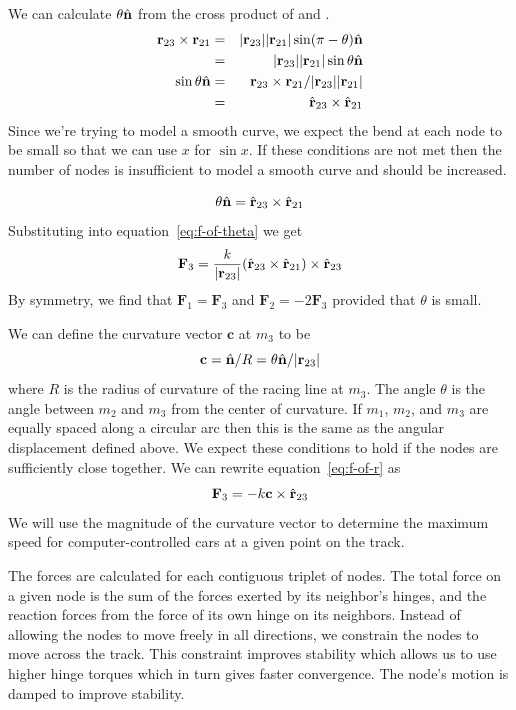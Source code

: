 \documentclass{article}
\begin{document}
We can calculate $\theta \hat{\mathbf{n}}$ from the cross product of  and .
\begin{eqnarray}
  \mathbf{r}_{\mathrm{23}} \times \mathbf{r}_{\mathrm{21}} & = & |\mathbf{r}_{\mathrm{23}}||\mathbf{r}_{\mathrm{21}}| \sin (\pi - \theta) \hat{\mathbf{n}} \\
  & = & |\mathbf{r}_{\mathrm{23}}||\mathbf{r}_{\mathrm{21}}| \sin \theta \hat{\mathbf{n}} \\
  \sin \theta \hat{\mathbf{n}} & = & \mathbf{r}_{\mathrm{23}} \times \mathbf{r}_{\mathrm{21}} / |\mathbf{r}_{\mathrm{23}}||\mathbf{r}_{\mathrm{21}}| \\
  & = & \hat{\mathbf{r}}_{23} \times \hat{\mathbf{r}}_{21}
\end{eqnarray}
Since we're trying to model a smooth curve, we expect the bend at each node to
be small so that we can use $x$ for $\sin x$.  If these conditions are not met
then the number of nodes is insufficient to model a smooth curve and should be
increased.

\begin{equation}
  \theta \hat{\mathbf{n}} = \hat{\mathbf{r}}_{23} \times \hat{\mathbf{r}}_{21}
  \label{eq:theta-n-hat}
\end{equation}
Substituting into equation~\ref{eq:f-of-theta} we get
\begin{equation}
  \mathbf{F}_3 = \frac{k}{|\mathbf{r}_{\mathrm{23}}|} (\hat{\mathbf{r}}_{23} \times \hat{\mathbf{r}}_{21}) \times \hat{\mathbf{r}}_{23}
  \label{eq:f-of-r}
\end{equation}
By symmetry, we find that $\mathbf{F}_1 = \mathbf{F}_3$ and $\mathbf{F}_2 =
-2\mathbf{F}_3$ provided that $\theta$ is small.

We can define the curvature vector $\mathbf{c}$ at $m_3$ to be
\begin{equation}
  \mathbf{c} = \hat{\mathbf{n}}/R = \theta \hat{\mathbf{n}} / |\mathbf{r}_{\mathrm{23}}|
\end{equation}
where $R$ is the radius of curvature of the racing line at $m_3$.  The angle
$\theta$ is the angle between $m_2$ and $m_3$ from the center of curvature.  If
$m_1$, $m_2$, and $m_3$ are equally spaced along a circular arc then this is the
same as the angular displacement defined above.  We expect these conditions to
hold if the nodes are sufficiently close together.  We can rewrite
equation~\ref{eq:f-of-r} as
\begin{equation}
  \mathbf{F}_3 = -k \mathbf{c} \times \hat{\mathbf{r}}_{23}
  \label{eq:f-with-curvature}
\end{equation}
We will use the magnitude of the curvature vector to determine the maximum speed
for computer-controlled cars at a given point on the track.

The forces are calculated for each contiguous triplet of nodes.  The total force
on a given node is the sum of the forces exerted by its neighbor's hinges, and
the reaction forces from the force of its own hinge on its neighbors.  Instead
of allowing the nodes to move freely in all directions, we constrain the nodes
to move across the track.  This constraint improves stability which allows us to
use higher hinge torques which in turn gives faster convergence.  The node's
motion is damped to improve stability.
\end{document}
